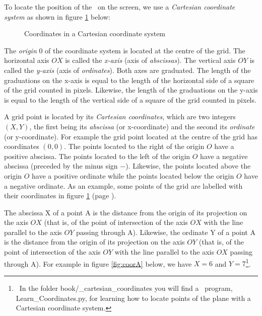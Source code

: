 To locate the position of the \robot\ on the screen, we use a {\em Cartesian coordinate system}
as shown in figure \ref{fig:repcar} below:

\begin{figure}[htbp]
 \caption{Coordinates in a Cartesian coordinate system}\label{fig:repcar}
\end{figure}

The {\em origin\/} $0$ of the coordinate system is located at the centre of the grid. The horizontal axis $OX$ is 
called the {\em x-axis\/} (axis of {\em abscissas\/}). The vertical axis $OY$ is 
called the {\em y-axis\/} (axis of {\em ordinates\/}). Both axes are graduated. The length of the
graduations on the x-axis is equal to the length of the horizontal side of a square 
 of the grid counted in pixels. Likewise, the length of the
graduations on the y-axis is equal to the length of the vertical side of a square
of the grid counted in pixels. 

A grid point is located by its {\em  Cartesian coordinates}, which are
two integers $(X, Y)$, the first being its {\em abscissa} (or x-coordinate) and the second its {\em ordinate} (or y-coordinate). For example the 
grid point located at the centre of the grid has coordinates $(0, 0)$. The points located
to the right of the origin $O$ have a positive abscissa. The points located
to the left of the origin $O$ have a negative abscissa (preceded by the minus sign $-$). 
Likewise, the points located above
the origin $O$ have a positive ordinate while the points located
below the origin $O$ have a negative ordinate.  As an example, some points of 
the grid are labelled with their coordinates in figure \ref{fig:repcar}  (page \pageref{fig:repcar}).  

The abscissa X of a point A is the distance from the origin of its projection on the axis $OX$
(that is, of the point of intersection
of the axis $OX$ with the line parallel to the axis $OY$ passing through A). Likewise, the ordinate Y of a point 
A is the distance from the origin of its projection on the axis $OY$
(that is, of the point of intersection
of the axis $OY$ with the line parallel to the axis $OX$ passing through A). For example in figure
\ref{fig:coorA} 
below,
we have $X = 6$ and $Y = 7$\footnote{\ In the folder {\idt book/\_cartesian\_coordinates} you will find
a \python\ program, {\idt Learn\_Coordinates.py}, for learning how to locate points of the plane with
a Cartesian coordinate system.}.

